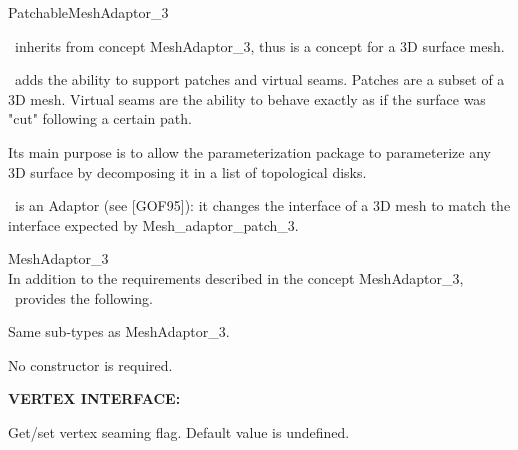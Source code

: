 

\begin{ccRefConcept}{PatchableMeshAdaptor_3}


\ccDefinition

\ccRefName\ inherits from concept MeshAdaptor\_3, thus is a concept
for a 3D surface mesh.

\ccRefName\ adds the ability to support patches and virtual seams.
Patches are a subset of a 3D mesh.
Virtual seams are the ability to behave exactly as if the surface was "cut"
following a certain path.

Its main purpose is to allow
the parameterization package to parameterize any 3D surface by decomposing it
in a list of topological disks.



\ccRefName\ is an Adaptor (see [GOF95]): it changes the
interface of a 3D mesh to match the interface expected by Mesh\_adaptor\_patch\_3.


\ccGeneralizes

MeshAdaptor\_3 \\

In addition to the requirements described in the concept MeshAdaptor\_3,
\ccRefName\ provides the following.


\ccTypes

Same sub-types as MeshAdaptor\_3.


\ccCreation
{}  %

No constructor is required.


\ccOperations

\textbf{VERTEX INTERFACE:}

	{Get/set vertex seaming flag. Default value is undefined.}
\ccGlue
{}


\end{ccRefConcept}
